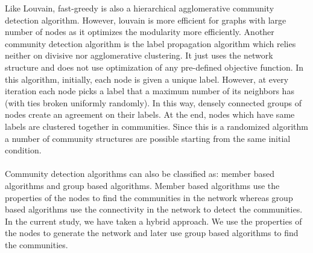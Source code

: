 \documentclass[11pt]{article}
\begin{document}
Like Louvain, fast-greedy\cite{clauset} is also a hierarchical agglomerative community detection algorithm. However, louvain is more efficient for graphs with large number of nodes as it optimizes the modularity more efficiently.   
Another community detection algorithm is the label propagation algorithm\cite{propagation} which relies neither on divisive nor agglomerative clustering. It just uses the network structure and does not use optimization of any pre-defined objective function. In this algorithm, initially, each node is given a unique label. However, at every iteration each node picks a label that a maximum number of its neighbors has (with ties broken uniformly randomly). In this way, densely connected groups of nodes  create an agreement on their labels. At the end, nodes which have same labels are clustered together in communities. Since this is a randomized algorithm a number of community structures are possible starting from the same initial condition.\\\\
Community detection algorithms can also be classified as: member based algorithms and group based algorithms. Member based algorithms use the properties of the nodes to find the communities in the network whereas group based algorithms use the connectivity in the network to detect the communities. In the current study, we have taken a hybrid approach. We use the properties of the nodes to generate the network and later use group based algorithms to find the communities.
\end{document}
